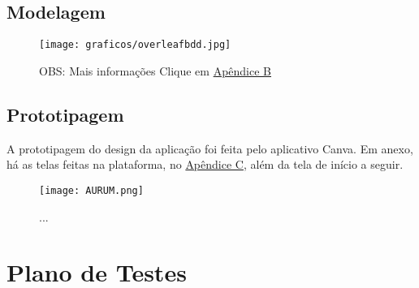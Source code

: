 \documentclass[
	article,			%
	12pt,				%
	oneside,			%
	a4paper,			%
	english,			%
	brazil,				%
	sumario=tradicional
	]{abntex2}
\begin{document}
\subsection{Modelagem}
\hypertarget{sec:modelagem}{}  %
\begin{figure}[H]  %
    \centering
    \begin{adjustbox}{width=0.70\paperwidth,center}
        \texttt{[image: graficos/overleafbdd.jpg]}
    \end{adjustbox}
    \label{gra_logo}

    \vspace{2mm}
    {\fontsize{13pt}{15pt}\selectfont
    OBS: Mais informações Clique em \hyperlink{apendiceB}{Apêndice B}}
\end{figure}

\hypertarget{sec:prot}{} %
\subsection{Prototipagem}
A prototipagem do design da aplicação foi feita pelo aplicativo Canva. Em
anexo, há as telas feitas na plataforma, no \hyperlink{apendiceC}{Apêndice C}, além da tela de início a seguir.

\begin{figure}[H]  %
    \centering
    \begin{adjustbox}{width=0.70\paperwidth,center}
        \texttt{[image: AURUM.png]}
    \end{adjustbox}
    \label{gra_logo2}

    \vspace{2mm}
    {\fontsize{13pt}{15pt}\selectfont ...}
\end{figure}





\section{Plano de Testes}
\end{document}
